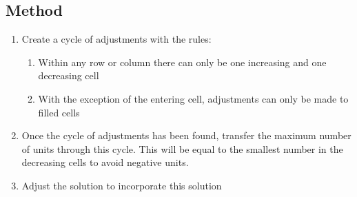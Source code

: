 \documentclass{article}[18pt]
\begin{document}
\subsection{Method}
\begin{enumerate}
\item Create a cycle of adjustments with the rules:
\begin{enumerate}
\item Within any row or column there can only be one increasing and one decreasing cell
\item With the exception of the entering cell, adjustments can only be made to filled cells
\end{enumerate}
\item Once the cycle of adjustments has been found, transfer the maximum number of units through this cycle. This will be equal to the smallest number in the decreasing cells to avoid negative units.
\item Adjust the solution to incorporate this solution
\end{enumerate}
\end{document}
